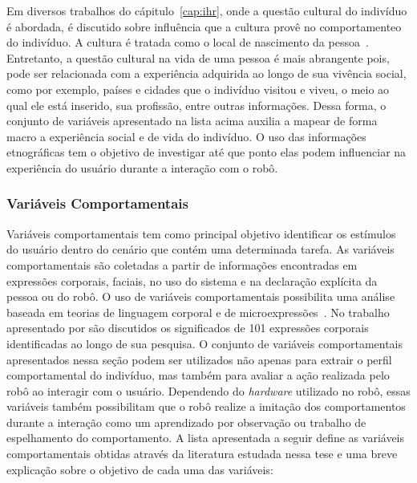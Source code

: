 Em diversos trabalhos do cápitulo~\ref{cap:ihr}, onde a questão cultural do indivíduo é abordada, é discutido sobre influência que a cultura provê no comportamenteo do indivíduo. A cultura é tratada como o local de nascimento da pessoa~\cite{eresha:2013}. Entretanto, a questão cultural na vida de uma pessoa é mais abrangente pois, pode ser relacionada com a experiência adquirida ao longo de sua vivência social, como por exemplo, países e cidades que o indivíduo visitou e viveu, o meio ao qual ele está inserido, sua profissão, entre outras informações. Dessa forma, o conjunto de variáveis apresentado na lista acima auxilia a mapear de forma macro a experiência social e de vida do indivíduo. O uso das informações etnográficas tem o objetivo de investigar até que ponto elas podem influenciar na experiência do usuário durante a interação com o robô.

\subsubsection{Variáveis Comportamentais}
\label{sec:reacoes}
Variáveis comportamentais tem como principal objetivo identificar os estímulos do usuário dentro do cenário que contém uma determinada tarefa. As variáveis comportamentais são coletadas a partir de informações encontradas em expressões corporais, faciais, no uso do sistema e na declaração explícita da pessoa ou do robô. O uso de variáveis comportamentais possibilita uma análise baseada em teorias de linguagem corporal e de microexpressões~\cite{lambert:2008}. No trabalho apresentado por \textcite{lambert:2008} são discutidos os significados de 101 expressões corporais identificadas ao longo de sua pesquisa. O conjunto de variáveis comportamentais apresentados nessa seção podem ser utilizados não apenas para extrair o perfil comportamental do indivíduo, mas também para avaliar a ação realizada pelo robô ao interagir com o usuário. Dependendo do \emph{hardware} utilizado no robô, essas variáveis também possibilitam que o robô realize a imitação dos comportamentos durante a interação como um aprendizado por observação ou trabalho de espelhamento do comportamento. A lista apresentada a seguir define as variáveis comportamentais obtidas através da literatura estudada nessa tese e uma breve explicação sobre o objetivo de cada uma das variáveis:

